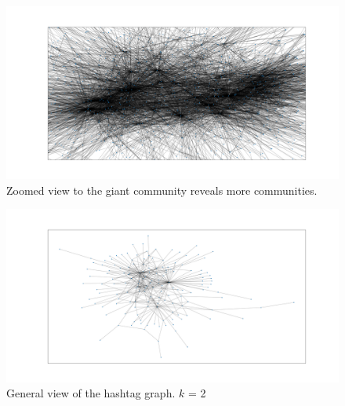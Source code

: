 \documentclass[conference]{IEEEtran}
\begin{document}
    \begin{figure}
        \includegraphics[scale=0.32]{figures/general_graph_zoomed}
        \caption{Zoomed view to the giant community reveals more communities.}
        \label{fig:graph-general-zoomed}
    \end{figure}
    \begin{figure}
        \includegraphics[scale=0.32]{figures/general_graph_k_2}
        \caption{General view of the hashtag graph. $k$ = 2}
        \label{fig:graph-general-k2}
    \end{figure}
\end{document}
